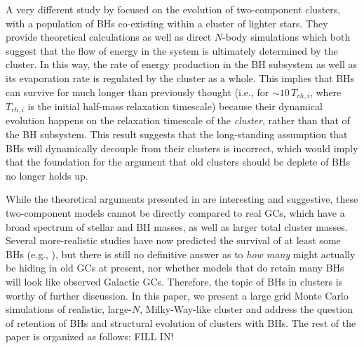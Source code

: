 \documentclass[12pt,preprint]{aastex}
\begin{document}
A very different study by \cite{Breen2013} focused on the evolution of two-component clusters, with a population of BHs co-existing within a cluster of lighter stars. They provide theoretical calculations as well as direct $N$-body simulations which both suggest that the flow of energy in the system is ultimately determined by the cluster. In this way, the rate of energy production in the BH subsystem as well as its evaporation rate is regulated by the cluster as a whole. This implies that BHs can survive for much longer than previously thought (i.e., for $\sim 10\, T_{rh,i}$, where $T_{rh,i}$ is the initial half-mass relaxation timescale) because their dynamical evolution happens on the relaxation timescale of the \emph{cluster}, rather than that of the BH subsystem. This result suggests that the long-standing assumption that BHs will dynamically decouple from their clusters is incorrect, which would imply that the foundation for the argument that old clusters should be deplete of BHs no longer holds up.

While the theoretical arguments presented in \cite{Breen2013} are interesting and suggestive, these two-component models cannot be directly compared to real GCs, which have a  broad spectrum of stellar and BH masses, as well as larger total cluster masses. Several more-realistic studies have now predicted the survival of at least some BHs (e.g., \citealt{Mackey2008, Morscher2013, Sippel2013}), but there is still no definitive answer as to \emph{how many} might actually be hiding in old GCs at present, 
nor whether models that do retain many BHs will look like observed Galactic GCs. Therefore, the topic of BHs in clusters is worthy of further discussion.
In this paper, we present a large grid Monte Carlo simulations of realistic, large-$N$, Milky-Way-like cluster and address the question of retention of BHs and structural evolution of clusters with BHs.
The rest of the paper is organized as follows:  FILL IN!


\end{document}

